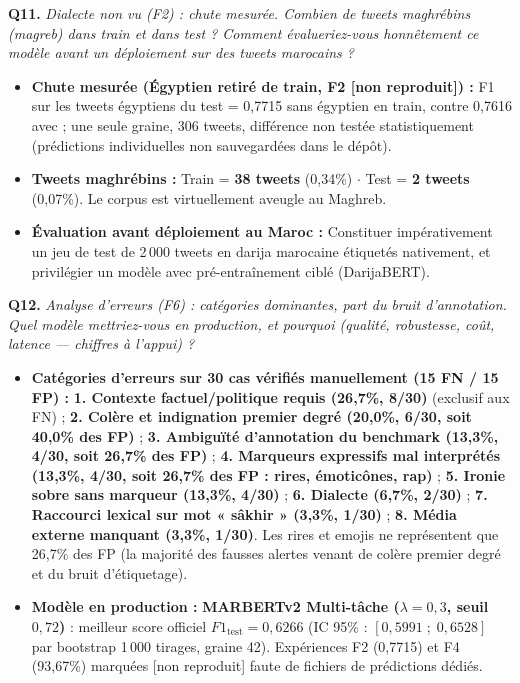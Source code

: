 \documentclass[10pt,a4paper]{article}
\newcommand{\questiontitle}[2]{%
  \noindent\textbf{#1.} \textit{#2}\par\vspace{1.5pt}%
}
\begin{document}
\questiontitle{Q11}{Dialecte non vu (F2) : chute mesurée. Combien de tweets maghrébins (magreb) dans train et dans test ? Comment évalueriez-vous honnêtement ce modèle avant un déploiement sur des tweets marocains ?}
\begin{tcolorbox}[reponsebox]
  \begin{itemize}
    \item \textbf{Chute mesurée (Égyptien retiré de train, F2 [non reproduit]) :} F1 sur les tweets égyptiens du test = 0,7715 sans égyptien en train, contre 0,7616 avec ; une seule graine, 306 tweets, différence non testée statistiquement (prédictions individuelles non sauvegardées dans le dépôt).
    \item \textbf{Tweets maghrébins :} Train = \textbf{38 tweets} (0,34\%) $\cdot$ Test = \textbf{2 tweets} (0,07\%). Le corpus est virtuellement aveugle au Maghreb.
    \item \textbf{Évaluation avant déploiement au Maroc :} Constituer impérativement un jeu de test de 2\,000 tweets en darija marocaine étiquetés nativement, et privilégier un modèle avec pré-entraînement ciblé (DarijaBERT).
  \end{itemize}
\end{tcolorbox}

\questiontitle{Q12}{Analyse d'erreurs (F6) : catégories dominantes, part du bruit d'annotation. Quel modèle mettriez-vous en production, et pourquoi (qualité, robustesse, coût, latence — chiffres à l'appui) ?}
\begin{tcolorbox}[reponsebox]
  \begin{itemize}
    \item \textbf{Catégories d'erreurs sur 30 cas vérifiés manuellement (15 FN / 15 FP) :} \textbf{1. Contexte factuel/politique requis (26,7\%, 8/30)} (exclusif aux FN) ; \textbf{2. Colère et indignation premier degré (20,0\%, 6/30, soit 40,0\% des FP)} ; \textbf{3. Ambiguïté d'annotation du benchmark (13,3\%, 4/30, soit 26,7\% des FP)} ; \textbf{4. Marqueurs expressifs mal interprétés (13,3\%, 4/30, soit 26,7\% des FP : rires, émoticônes, rap)} ; \textbf{5. Ironie sobre sans marqueur (13,3\%, 4/30)} ; \textbf{6. Dialecte (6,7\%, 2/30)} ; \textbf{7. Raccourci lexical sur mot « sâkhir » (3,3\%, 1/30)} ; \textbf{8. Média externe manquant (3,3\%, 1/30)}. Les rires et emojis ne représentent que 26,7\% des FP (la majorité des fausses alertes venant de colère premier degré et du bruit d'étiquetage).
    \item \textbf{Modèle en production :} \textbf{MARBERTv2 Multi-tâche ($\lambda=0{,}3$, seuil $0{,}72$)} : meilleur score officiel $F1_{\text{test}} = 0{,}6266$ (IC 95\% : $[0{,}5991 \;;\; 0{,}6528]$ par bootstrap 1\,000 tirages, graine 42). Expériences F2 (0,7715) et F4 (93,67\%) marquées [non reproduit] faute de fichiers de prédictions dédiés.
  \end{itemize}
\end{tcolorbox}
\end{document}

